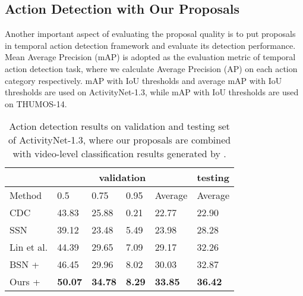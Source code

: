\documentclass[10pt,twocolumn,letterpaper]{article}
\begin{document}
\subsection{Action Detection with Our Proposals}

Another important aspect of evaluating the proposal quality is to put proposals in temporal action detection framework and evaluate its detection performance.
Mean Average Precision (mAP) is adopted as the evaluation metric of temporal action detection task, where we calculate Average Precision (AP) on each action category respectively. mAP with IoU thresholds  and average mAP with IoU thresholds  are used on ActivityNet-1.3, while mAP with IoU thresholds  are used on THUMOS-14.




\begin{table}[tbp]
\centering
\caption{Action detection results on validation and testing set of ActivityNet-1.3, where our proposals are combined with video-level classification results generated by \cite{zhao2017cuhk}.  }
\small
\begin{tabular}{p{2.1cm}p{0.62cm}<{\centering}p{0.62cm}<{\centering}p{0.62cm}<{\centering}p{0.9cm}<{\centering}p{0.9cm}<{\centering}}
\toprule
 & \multicolumn{4}{c}{validation} & testing  \\
\hline
Method  & 0.5  &  0.75  & 0.95  & Average  & Average  \\
\hline
CDC \cite{shou2017cdc}    & 43.83  & 25.88  & 0.21   & 22.77  & 22.90 \\
SSN \cite{xiong2017pursuit}    & 39.12 & 23.48  & 5.49  & 23.98 & 28.28 \\
Lin et al. \cite{lin2017temporal} & 44.39   & 29.65  & 7.09  & 29.17 & 32.26 \\
BSN \cite{lin2018bsn} + \cite{zhao2017cuhk} & 46.45  & 29.96 & 8.02  & 30.03 & 32.87 \\
\hline
Ours + \cite{zhao2017cuhk} & {\bf 50.07} & {\bf 34.78} & {\bf 8.29} & {\bf 33.85} & {\bf 36.42} \\
\bottomrule
\end{tabular}
\label{table_detection_anet}
\end{table}
\end{document}
